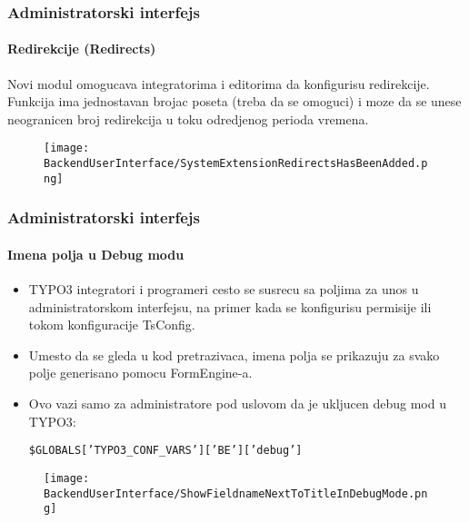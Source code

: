 
\begin{frame}[fragile]
	\frametitle{Administratorski interfejs}
	\framesubtitle{Redirekcije (Redirects)}

	Novi modul omogucava integratorima i editorima da konfigurisu redirekcije.
	Funkcija ima jednostavan brojac poseta (treba da se omoguci) 
	i moze da se unese neogranicen broj redirekcija u toku odredjenog perioda vremena.

	\begin{figure}
		\texttt{[image: BackendUserInterface/SystemExtensionRedirectsHasBeenAdded.png]}
	\end{figure}

\end{frame}


\begin{frame}[fragile]
	\frametitle{Administratorski interfejs}
	\framesubtitle{Imena polja u Debug modu}

	\begin{itemize}

		\item TYPO3 integratori i programeri cesto se susrecu sa poljima za unos u administratorskom interfejsu,
			na primer kada se konfigurisu permisije ili tokom konfiguracije TsConfig.

		\item Umesto da se gleda u kod pretrazivaca, imena polja se prikazuju za svako polje generisano pomocu FormEngine-a.

		\item Ovo vazi samo za administratore pod uslovom da je ukljucen debug mod u TYPO3:

			\smaller
				\texttt{\$GLOBALS['TYPO3\_CONF\_VARS']['BE']['debug']}
			\normalsize

	\end{itemize}

	\begin{figure}
		\texttt{[image: BackendUserInterface/ShowFieldnameNextToTitleInDebugMode.png]}
	\end{figure}

\end{frame}

